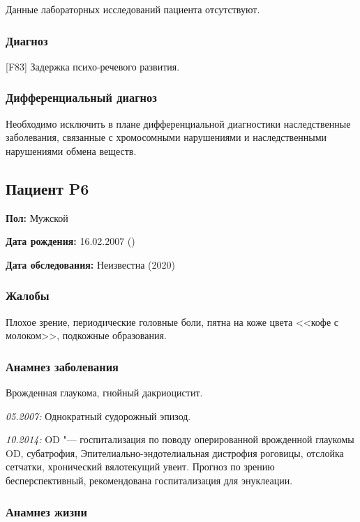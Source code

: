 \documentclass[a4paper,14pt]{extarticle}
\newcommand{\pdate}[1]{\emph{#1:} }
\newcommand{\DS}[2]{[#2] #1}
\begin{document}
Данные лабораторных исследований пациента отсутствуют.

\subsubsection*{Диагноз}

\DS{Задержка психо-речевого развития}{F83}.

\subsubsection*{Дифференциальный диагноз}

Необходимо исключить в плане дифференциальной диагностики наследственные заболевания, связанные с хромосомными нарушениями и наследственными нарушениями обмена  веществ. 

\newpage
\subsection*{Пациент P6}

\textbf{Пол:} Мужской

\textbf{Дата рождения:} 16.02.2007 ()

\textbf{Дата обследования:} Неизвестна (2020)

\subsubsection*{Жалобы}

Плохое зрение, периодические головные боли, пятна на коже цвета <<кофе с молоком>>, подкожные образования.

\subsubsection*{Анамнез заболевания}

Врожденная глаукома, гнойный дакриоцистит.

\pdate{05.2007} Однократный судорожный эпизод.

\pdate{10.2014} OD "--- госпитализация по поводу оперированной врожденной глаукомы OD, субатрофия, 
Эпителиально-эндотелиальная дистрофия роговицы, отслойка сетчатки, хронический вялотекущий увеит.
Прогноз по зрению бесперспективный, рекомендована госпитализация для энуклеации.

\subsubsection*{Анамнез жизни}
\end{document}

